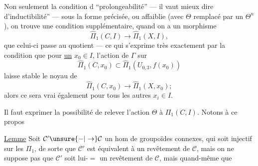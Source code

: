 Non seulement la condition d  ``prolongeabilité'' --- il vaut mieux dire d'inductibilité'' --- sous la forme précisée, ou affaiblie (avec $\Theta$ remplacé par un $\Theta^n$), on trouve une condition supplémentaire, quand on a  un morphisme
\[
\widehat\Pi_1(C,I)\longrightarrow\widehat\Pi_1(X,I),
\]
que celui-ci passe au quotient --- ce qui s'exprime très exactement par la condition que pour \uline{un} $x_0\in I$, l'action de $\Gamma$ sur
\[
\widehat\Pi_1(C,x_0)\subset\widehat\Pi_1(U_{0,3},f(x_0))
\]
laisse stable le noyau de
\[
\widehat\Pi_1(C,x_0)\longrightarrow\widehat\Pi_1(X,x_0);
\]
alors ce sera vrai également pour tous les autres $x_i\in I$.

Il faut exprimer la possibilité de relever l'action  $\Theta$ à $\Pi_1(C,I)$. Notons à ce propos

\uline{Lemme} Soit $\mathcal C'\unsure{\mathbin{-}|\to}\mathcal C$ un hom de groupoïdes connexes, qui soit injectif sur les $\Pi_1$,  de sorte que $\mathcal C'$ est équivalent à un revêtement de $\mathcal C$, mais on ne suppose pas que $\mathcal C'$ soit lui-$=$ un revêtement de $\mathcal C$, mais quand-même que
